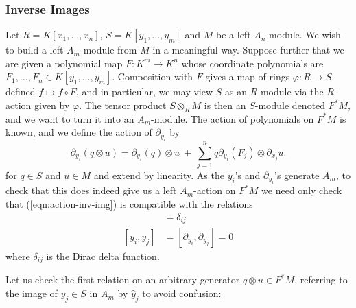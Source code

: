\subsubsection{Inverse Images}
Let $R = K[x_1,...,x_n]$, $S = K[y_1,...,y_m]$ and $M$ be a left $A_n$-module. We wish to build a left $A_m$-module from $M$ in a meaningful way. Suppose further that we are given a polynomial map $F:K^m\to K^n$ whose coordinate polynomials are $F_1,...,F_n\in K[y_1,...,y_m]$. Composition with $F$ gives a map of rings $\varphi:R\to S$ defined $f\mapsto f\circ F$, and in particular, we may view $S$ as an $R$-module via the $R$-action given by $\varphi$. The tensor product $S\otimes_R M$ is then an $S$-module denoted $F^*M$, and we want to turn it into an $A_m$-module. The action of polynomials on $F^*M$ is known, and we define the action of $\partial_{y_i}$ by
\begin{equation}\label{eqn:action-inv-img}\tag{$\ast$}
	\partial_{y_i}(q\otimes u) = \partial_{y_i}(q) \otimes u ~ + ~ \sum_{j=1}^n q\partial_{y_i}(F_j) \otimes \partial_{x_j} u.
\end{equation}
for $q\in S$ and $u\in M$ and extend by linearity. As the $y_i$'s and $\partial_{y_i}$'s generate $A_m$, to check that this does indeed give us a left $A_m$-action on $F^*M$ we need only check that (\ref{eqn:action-inv-img}) is compatible with the relations
\begin{align*}
	[\partial_{y_i}, y_j] &= \delta_{ij} \\
	[y_i,y_j] &= [\partial_{y_i},\partial_{y_j}] = 0
\end{align*}
where $\delta_{ij}$ is the Dirac delta function.

Let us check the first relation on an arbitrary generator $q\otimes u \in F^*M$, referring to the image of $y_j \in S$ in $A_m$ by $\hat{y}_j$ to avoid confusion:

